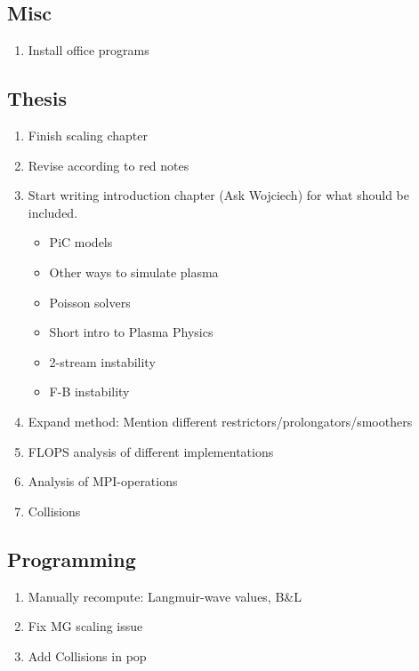 \subsection{Misc}
    \begin{enumerate}
        \item Install office programs
    \end{enumerate}

\subsection{Thesis}
\begin{enumerate}
  \item Finish scaling chapter
  \item Revise according to red notes
  \item Start writing introduction chapter (Ask Wojciech) for what should be included.
    \begin{itemize}
      \item PiC models
      \item Other ways to simulate plasma
      \item Poisson solvers
      \item Short intro to Plasma Physics
      \item 2-stream instability
      \item F-B instability
    \end{itemize}
  \item Expand method: Mention different restrictors/prolongators/smoothers
  \item FLOPS analysis of different implementations
  \item Analysis of MPI-operations
  \item Collisions
\end{enumerate}

\subsection{Programming}
\begin{enumerate}
  \item Manually recompute: Langmuir-wave values, B&L
  \item Fix MG scaling issue
  \item Add Collisions in pop
\end{enumerate}
